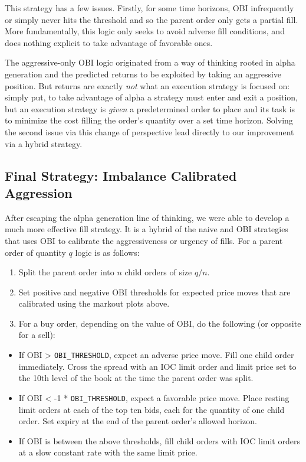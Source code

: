 \documentclass[
  letterpaper,
]{article}
\providecommand{\tightlist}{%
  \setlength{\itemsep}{0pt}\setlength{\parskip}{0pt}}
\begin{document}
This strategy has a few issues. Firstly, for some time horizons, OBI
infrequently or simply never hits the threshold and so the parent order
only gets a partial fill. More fundamentally, this logic only seeks to
avoid adverse fill conditions, and does nothing explicit to take
advantage of favorable ones.

The aggressive-only OBI logic originated from a way of thinking rooted
in alpha generation and the predicted returns to be exploited by taking
an aggressive position. But returns are exactly \emph{not} what an
execution strategy is focused on: simply put, to take advantage of alpha
a strategy must enter and exit a position, but an execution strategy is
\emph{given} a predetermined order to place and its task is to minimize
the cost filling the order's quantity over a set time horizon. Solving
the second issue via this change of perspective lead directly to our
improvement via a hybrid strategy.

\subsection{Final Strategy: Imbalance Calibrated
Aggression}\label{sec-hybrid}

After escaping the alpha generation line of thinking, we were able to
develop a much more effective fill strategy. It is a hybrid of the naive
and OBI strategies that uses OBI to calibrate the aggressiveness or
urgency of fills. For a parent order of quantity \(q\) logic is as
follows:

\begin{enumerate}
\def\labelenumi{\arabic{enumi}.}
\tightlist
\item
  Split the parent order into \(n\) child orders of size \(q/n\).
\item
  Set positive and negative OBI thresholds for expected price moves that
  are calibrated using the markout plots above.
\item
  For a buy order, depending on the value of OBI, do the following (or
  opposite for a sell):
\end{enumerate}

\begin{itemize}
\tightlist
\item
  If OBI \textgreater{} \texttt{OBI\_THRESHOLD}, expect an adverse price
  move. Fill one child order immediately. Cross the spread with an IOC
  limit order and limit price set to the 10th level of the book at the
  time the parent order was split.
\item
  If OBI \textless{} -1 * \texttt{OBI\_THRESHOLD}, expect a favorable
  price move. Place resting limit orders at each of the top ten bids,
  each for the quantity of one child order. Set expiry at the end of the
  parent order's allowed horizon.
\item
  If OBI is between the above thresholds, fill child orders with IOC
  limit orders at a slow constant rate with the same limit price.
\end{itemize}
\end{document}
